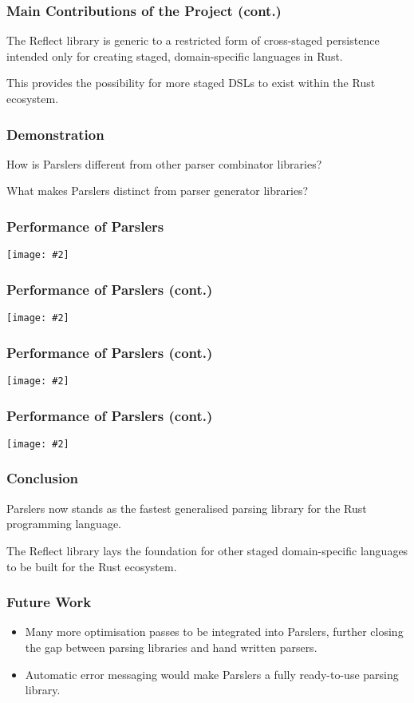 \documentclass{slides}
\newcommand{\centerimg}[2]{
    \begin{center}
        \texttt{[image: \#2]}
    \end{center}
}
\begin{document}
\begin{frame}[fragile]
\frametitle{Main Contributions of the Project (cont.)}

The Reflect library is generic to a restricted form of cross-staged persistence intended only for creating staged, domain-specific languages in Rust. 

This provides the possibility for more staged DSLs to exist within the Rust ecosystem.

\end{frame}

\begin{frame}
\frametitle{Demonstration}
How is Parslers different from other parser combinator libraries?

What makes Parslers distinct from parser generator libraries?
\end{frame}

\begin{frame}
\frametitle{Performance of Parslers}
\centerimg{width=\textwidth}{Throughput of Parsers Built with Different Parsing Libraries (JSON).png}
\end{frame}

\begin{frame}
\frametitle{Performance of Parslers (cont.)}
\centerimg{width=\textwidth}{Throughput of Parsers Built with Different Parsing Libraries (Branflakes).png}
\end{frame}

\begin{frame}
\frametitle{Performance of Parslers (cont.)}
\centerimg{width=\textwidth}{Throughput of Parslers with Different Optimisations (JSON).png}
\end{frame}

\begin{frame}
\frametitle{Performance of Parslers (cont.)}
\centerimg{width=\textwidth}{Throughput of Parslers with Different Optimisations (Branflakes).png}
\end{frame}

\begin{frame}
\frametitle{Conclusion}

Parslers now stands as the fastest generalised parsing library for the Rust programming language.

The Reflect library lays the foundation for other staged domain-specific languages to be built for the Rust ecosystem.

\end{frame}

\begin{frame}
\frametitle{Future Work}

\begin{itemize}
    \item Many more optimisation passes to be integrated into Parslers, further closing the gap between parsing libraries and hand written parsers.
    \item Automatic error messaging would make Parslers a fully ready-to-use parsing library.
\end{itemize} 

\end{frame}
\end{document}
